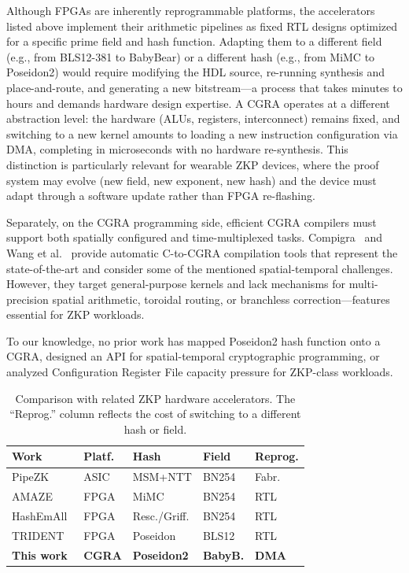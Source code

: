 Although FPGAs are inherently reprogrammable platforms, the accelerators listed above implement their arithmetic pipelines as fixed RTL designs optimized for a specific prime field and hash function. Adapting them to a different field (e.g., from BLS12-381 to BabyBear) or a different hash (e.g., from MiMC to Poseidon2) would require modifying the HDL source, re-running synthesis and place-and-route, and generating a new bitstream---a process that takes minutes to hours and demands hardware design expertise. A CGRA operates at a different abstraction level: the hardware (ALUs, registers, interconnect) remains fixed, and switching to a new kernel amounts to loading a new instruction configuration via DMA, completing in microseconds with no hardware re-synthesis. This distinction is particularly relevant for wearable ZKP devices, where the proof system may evolve (new field, new exponent, new hash) and the device must adapt through a software update rather than FPGA re-flashing.

Separately, on the CGRA programming side, efficient CGRA compilers must support both spatially configured and time-multiplexed tasks. Compigra~\cite{compigra} and Wang et al.~\cite{wang2025mlir} provide automatic C-to-CGRA compilation tools that represent the state-of-the-art and consider some of the mentioned spatial-temporal challenges. However, they target general-purpose kernels and lack mechanisms for multi-precision spatial arithmetic, toroidal routing, or branchless correction---features essential for ZKP workloads.

To our knowledge, no prior work has mapped Poseidon2 hash function onto a CGRA, designed an API for spatial-temporal cryptographic programming, or analyzed Configuration Register File capacity pressure for ZKP-class workloads.

\begin{table}[t]
\caption{Comparison with related ZKP hardware accelerators.
The ``Reprog.'' column reflects the cost of switching to a different hash or field.}
\label{tab:related-work}
\centering
\scriptsize
\setlength{\tabcolsep}{2pt}
\begin{tabular}{@{}lllll@{}}
\toprule
\textbf{Work} & \textbf{Platf.} & \textbf{Hash} & \textbf{Field} & \textbf{Reprog.} \\
\midrule
PipeZK~\cite{pipezk} & ASIC & MSM+NTT & BN254 & Fabr. \\
AMAZE~\cite{amaze} & FPGA & MiMC & BN254 & RTL \\
HashEmAll~\cite{hashemall} & FPGA & Resc./Griff. & BN254 & RTL \\
TRIDENT~\cite{trident} & FPGA & Poseidon & BLS12 & RTL \\
\textbf{This work} & \textbf{CGRA} & \textbf{Poseidon2} & \textbf{BabyB.} & \textbf{DMA} \\
\bottomrule
\end{tabular}
\end{table}
